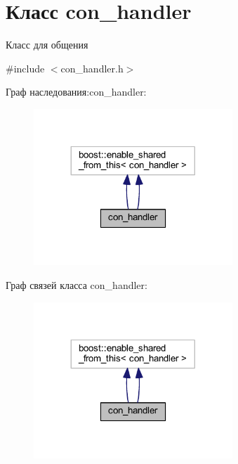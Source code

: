 \hypertarget{classcon__handler}{}\section{Класс con\+\_\+handler}
\label{classcon__handler}


Класс для общения  




{\ttfamily \#include $<$con\+\_\+handler.\+h$>$}



Граф наследования\+:con\+\_\+handler\+:
\nopagebreak
\begin{figure}[H]
\begin{center}
\leavevmode
\includegraphics[width=212pt]{classcon__handler__inherit__graph}
\end{center}
\end{figure}


Граф связей класса con\+\_\+handler\+:
\nopagebreak
\begin{figure}[H]
\begin{center}
\leavevmode
\includegraphics[width=212pt]{classcon__handler__coll__graph}
\end{center}
\end{figure}
